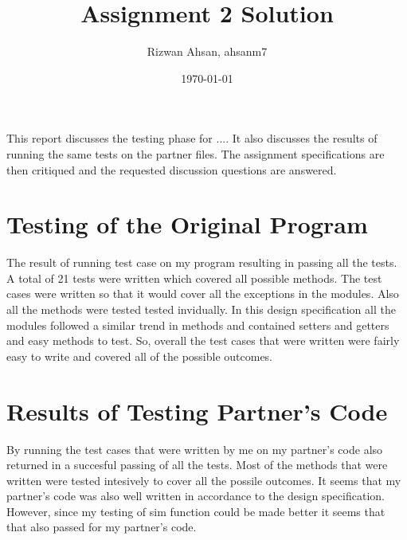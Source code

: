 \documentclass[12pt]{article}
\title{Assignment 2 Solution}
\author{Rizwan Ahsan, ahsanm7}
\date{\today}
\begin{document}
\maketitle

This report discusses the testing phase for .... It also discusses the results
of running the same tests on the partner files. The assignment specifications
are then critiqued and the requested discussion questions are answered.

\section{Testing of the Original Program}
The result of running test case on my program resulting in passing all the tests. A total of 21 tests were written which covered all possible methods. The test cases were written so that it would cover all the exceptions in the modules. Also all the methods were tested tested invidually. In this design specification all the modules followed a similar trend in methods and contained setters and getters and easy methods to test. So, overall the test cases that were written were fairly easy to write and covered all of the possible outcomes.


\section{Results of Testing Partner's Code}
By running the test cases that were written by me on my partner's code also returned in a succesful passing of all the tests. Most of the methods that were written were tested intesively to cover all the possile outcomes. It seems that my partner's code was also well written in accordance to the design specification. However, since my testing of sim function could be made better it seems that that also passed for my partner's code.
\end{document}
